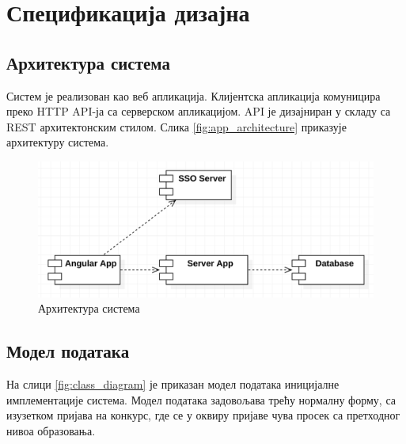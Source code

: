 \documentclass[a4paper]{article}
\begin{document}
\section*{Спецификација дизајна}

\subsection*{Архитектура система}

Систем је реализован као веб апликација. Клијентска апликација комуницира преко HTTP API-ја са серверском апликацијом. API је
дизајниран у складу са REST архитектонским стилом\cite{rest}. Слика \autoref{fig:app_architecture} приказује архитектуру система.

\begin{figure}[H]
    \centering
    \includegraphics{images/app_architecture.png}
    \caption{Архитектура система}
    \label{fig:app_architecture}
\end{figure}

\subsection*{Модел података}

На слици \autoref{fig:class_diagram} је приказан модел података иницијалне имплементације система. Модел података задовољава трећу нормалну форму, са
изузетком пријава на конкурс, где се у оквиру пријаве чува просек са претходног нивоа образовања.
\end{document}
